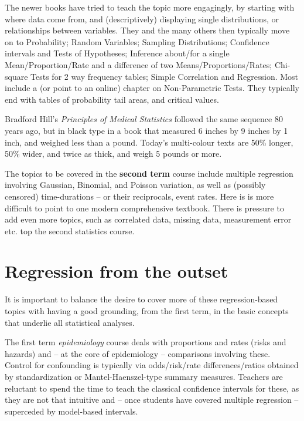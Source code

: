 \documentclass[]{book}
\begin{document}
The newer books have tried to teach the topic more engagingly, by starting with where data come from, and (descriptively) displaying single distributions, or relationships between variables. They and the many others then typically move on to Probability; Random Variables; Sampling Distributions; Confidence intervals and Tests of Hypotheses; Inference about/for a single Mean/Proportion/Rate and a difference of two Means/Proportions/Rates; Chi-square Tests for 2 way frequency tables; Simple Correlation and Regression. Most include a (or point to an online) chapter on Non-Parametric Tests. They typically end with tables of probability tail areas, and critical values.

Bradford Hill's \emph{Principles of Medical Statistics} followed the same sequence 80 years ago, but in black type in a book that measured 6 inches by 9 inches by 1 inch, and weighed less than a pound. Today's multi-colour texts are 50\% longer, 50\% wider, and twice as thick, and weigh 5 pounds or more.

The topics to be covered in the \textbf{second term} course include multiple regression involving
Gaussian, Binomial, and Poisson variation, as well
as (possibly censored) time-durations -- or their reciprocals, event rates. Here is is more difficult to point to one modern comprehensive textbook.
There is pressure to add even more topics, such as correlated data, missing data, measurement error etc. top the second statistics course.

\hypertarget{regression-from-the-outset}{%
\section{Regression from the outset}\label{regression-from-the-outset}}

It is important to balance the desire to cover more of these regression-based topics with having a good grounding, from the first term, in the basic concepts that underlie all statistical analyses.

The first term \emph{epidemiology} course deals with proportions and rates (risks and hazards) and -- at the core of epidemiology -- comparisons involving these. Control for confounding is typically via odds/risk/rate differences/ratios obtained by standardization or Mantel-Haenszel-type summary measures. Teachers are reluctant to spend the time to teach the classical confidence intervals for these, as they are not that intuitive and -- once students have covered multiple regression -- superceded by model-based intervals.
\end{document}
